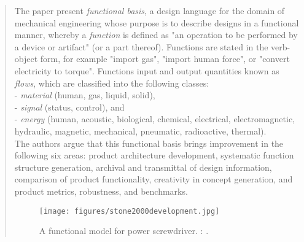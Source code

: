 		
		\begin{quote}
		\small
		The paper present {\em functional basis}, a design language for the domain of
		mechanical engineering whose purpose is to 
		describe designs in a functional manner, whereby a {\em function} is defined as 
		"an operation to be performed by a device or artifact" (or a part thereof).
		Functions are stated in the verb-object form, for example "import gas", "import human force",
		or "convert electricity to torque". Functions input and output quantities known
		as {\em flows}, which are classified into the following classes:\\
		- {\em material} (human, gas, liquid, solid), \\
		- {\em signal} (status, control), and \\
		- {\em energy} (human, acoustic, biological, chemical, electrical, electromagnetic, hydraulic,
			magnetic, mechanical, pneumatic, radioactive, thermal).\\
		The authors argue that this functional basis brings improvement in the following six areas:
		product architecture development,
		systematic function structure generation,
		archival and transmittal of design information,
		comparison of product functionality,
		creativity in concept generation, and
		product metrics, robustness, and benchmarks.
		\begin{figure}[htb]
		\begin{center}
		\texttt{[image: figures/stone2000development.jpg]}
		\caption{
		A functional model for power screwdriver. 
		\citeauthor{stone2000development}: 
		\cite{stone2000development}.}
		\label{fig:stone2000development}
		\end{center}
		\end{figure}
		\end{quote}




